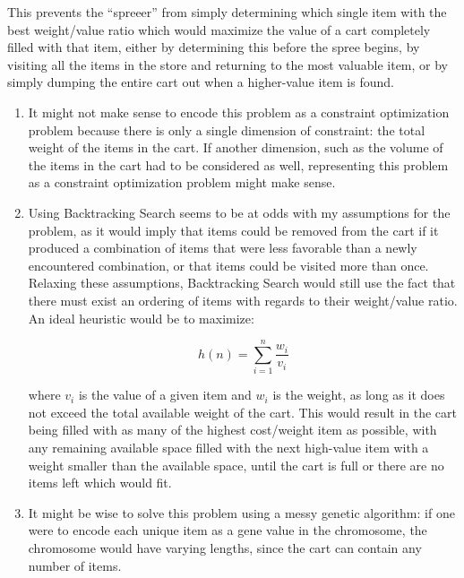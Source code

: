 \documentclass{article}
\begin{document}
\begin{enumerate}
{\begin{itemize}
\end{itemize}

This prevents the ``spreeer'' from simply determining which single item with
the best weight/value ratio which would maximize the value of a cart completely
filled with that item, either by determining this before the spree begins, by
visiting all the items in the store and returning to the most valuable item, or
by simply dumping the entire cart out when a higher-value item is found.}

\begin{enumerate}

\item{It might not make sense to encode this problem as a constraint
optimization problem because there is only a single dimension of constraint:
the total weight of the items in the cart. If another dimension, such as the
volume of the items in the cart had to be considered as well, representing this
problem as a constraint optimization problem might make sense.}

\item{Using Backtracking Search seems to be at odds with my assumptions for the
problem, as it would imply that items could be removed from the cart if it
produced a combination of items that were less favorable than a newly
encountered combination, or that items could be visited more than once.
Relaxing these assumptions, Backtracking Search would still use the fact that
there must exist an ordering of items with regards to their weight/value ratio.
An ideal heuristic would be to maximize:

\begin{equation*}
h(n) = \sum_{i=1}^n \frac{w_{i}}{v_{i}}
\end{equation*}

where $v_{i}$ is the value of a given item and $w_{i}$ is the weight, as long
as it does not exceed the total available weight of the cart. This would result
in the cart being filled with as many of the highest cost/weight item as
possible, with any remaining available space filled with the next high-value
item with a weight smaller than the available space, until the cart is full or
there are no items left which would fit.}

\item{It might be wise to solve this problem using a messy genetic algorithm:
if one were to encode each unique item as a gene value in the chromosome, the
chromosome would have varying lengths, since the cart can contain any number of
items.}


\end{enumerate}
\end{enumerate}
\end{document}

